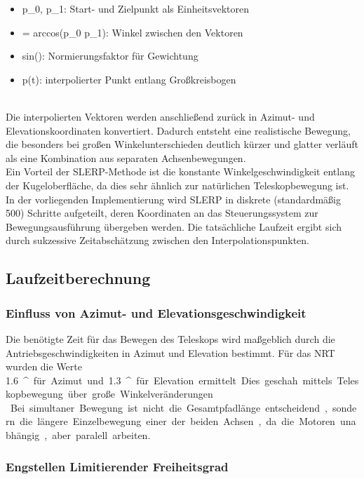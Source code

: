 \begin{itemize}
    \item p_0, p_1: Start- und Zielpunkt als Einheitsvektoren
    \item \omega = arccos(p_0 \cdot p_1): Winkel zwischen den Vektoren
    \item sin(\omega): Normierungsfaktor für Gewichtung
    \item p(t): interpolierter Punkt entlang Großkreisbogen
\end{itemize}
\\
Die interpolierten Vektoren werden anschließend zurück in Azimut- und Elevationskoordinaten konvertiert. Dadurch entsteht eine realistische Bewegung, die besonders bei großen Winkelunterschieden deutlich kürzer und glatter verläuft als eine Kombination aus separaten Achsenbewegungen.
\\
Ein Vorteil der SLERP-Methode ist die konstante Winkelgeschwindigkeit entlang der Kugeloberfläche, da dies sehr ähnlich zur natürlichen Teleskopbewegung ist.
In der vorliegenden Implementierung wird SLERP in diskrete (standardmäßig 500) Schritte aufgeteilt, deren Koordinaten an das Steuerungssystem zur Bewegungsausführung übergeben werden. Die tatsächliche Laufzeit ergibt sich durch sukzessive Zeitabschätzung zwischen den Interpolationspunkten.


\subsection{Laufzeitberechnung}

\subsubsection{Einfluss von Azimut- und Elevationsgeschwindigkeit}

Die benötigte Zeit für das Bewegen des Teleskops wird maßgeblich durch die Antriebsgeschwindigkeiten in Azimut und Elevation bestimmt. Für das NRT wurden die Werte \SI{1.6}{^\circ\per\second} für Azimut und \SI{1.3}{^\circ\per\second} für Elevation ermittelt. Dies geschah mittels Teleskopbewegung über große Winkelveränderungen.
\\
Bei simultaner Bewegung ist nicht die Gesamtpfadlänge entscheidend, sondern die längere Einzelbewegung einer der beiden Achsen, da die Motoren unabhängig, aber paralell arbeiten.

\subsubsection{Engstellen \textendash Limitierender Freiheitsgrad}

